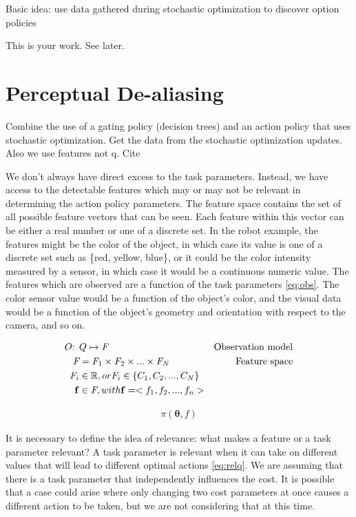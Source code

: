 \documentclass[12pt]{article}
\newcommand{\feat}   {\ensuremath{f}}
\newcommand{\featsp} {\ensuremath{\emph{F}}}
\newcommand{\obsm}   {\ensuremath{O}}
\newcommand{\app}    {\ensuremath{\bm{\theta}}}
\newcommand{\taskpsp}{\ensuremath{Q}}
\newcommand{\featv}  {\ensuremath{\mathbf{f}}}
\begin{document}
Basic idea: use data gathered during stochastic optimization to discover option policies

This is your work. See later.


\section{Perceptual De-aliasing}

\color{red}Combine the use of a gating policy (decision trees) and an action policy that uses stochastic optimization. Get the data from the stochastic optimization updates. Also we use features not q. Cite \citet{piater11learning}\color{black}

We don't always have direct excess to the task parameters. Instead, we have access to the detectable features which may or may not be relevant in determining the action policy parameters.  The feature space contains the set of all possible feature vectors that can be seen. Each feature within this vector can be either a real number or one of a discrete set. In the robot example, the features might be the color of the object, in which case its value is one of a discrete set such as \{red, yellow, blue\}, or it could be the color intensity measured by a sensor, in which case it would be a continuous numeric value. The features which are observed are a function of the task parameters \eqref{eq:obs}. The color sensor value would be a function of the object's color, and the visual data would be a function of the object's geometry and orientation with respect to the camera, and so on.

\begin{align}
\obsm\mbox{: } &\label{eq:obs}\taskpsp \mapsto \featsp& \mbox{Observation model}\\
\featsp &= \featsp_1 \times \featsp_2 \times ... \times \featsp_N & \mbox{Feature space}\\
\featsp_i &\in \mathbb{R}, or \featsp_i \in \{C_1,C_2,...,C_N\}&\notag\\
\featv &\in \featsp, with \featv = <\feat_1,\feat_2,...,\feat_n>&
\end{align}

\begin{align}
\label{eq:fgating}\pi(\app,\feat)
\end{align}

It is necessary to define the idea of relevance: what makes a feature or a task parameter relevant? A task parameter is relevant when it can take on different values that will lead to different optimal actions \eqref{eq:relq}. We are assuming that there is a task parameter that independently influences the cost. It is possible that a case could arise where only changing two cost parameters at once causes a different action to be taken, but we are not considering that at this time. 
\end{document}
